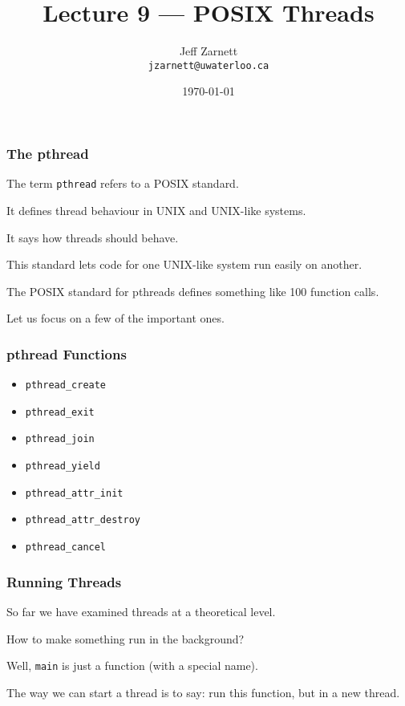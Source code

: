 

\title{Lecture 9 --- POSIX Threads}

\author{Jeff Zarnett \\ \small \texttt{jzarnett@uwaterloo.ca}}
\date{\today}




\begin{frame}
  \titlepage

 \end{frame}


\begin{frame}
\frametitle{The pthread}

The term \texttt{pthread} refers to a POSIX standard.


It defines thread behaviour in UNIX and UNIX-like systems.

It says how threads should behave. 

This standard lets code for one UNIX-like system run easily on another. 

The POSIX standard for pthreads defines something like 100 function calls.

Let us focus on a few of the important ones.

\end{frame}


\begin{frame}
\frametitle{pthread Functions}

\begin{itemize}
	\item \texttt{pthread\_create}
	\item \texttt{pthread\_exit}
	\item \texttt{pthread\_join}
	\item \texttt{pthread\_yield}
	\item \texttt{pthread\_attr\_init}
	\item \texttt{pthread\_attr\_destroy}
	\item \texttt{pthread\_cancel}
\end{itemize}



\end{frame}


\begin{frame}
\frametitle{Running Threads}

So far we have examined threads at a theoretical level.

How to make something run in the background?

Well, \texttt{main} is just a function (with a special name).

The way we can start a thread is to say: run this function, but in a new thread.

\end{frame}


